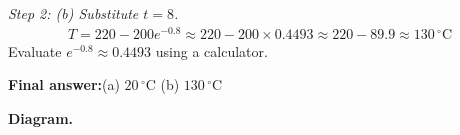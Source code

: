 \documentclass[11pt]{article}
\begin{document}
\textit{Step 2: (b) Substitute \( t = 8 \).}
\[\begin{gathered}
T = 220 - 200e^{-0.8} \approx 220 - 200 \times 0.4493 \approx 220 - 89.9 \approx 130\,^\circ\!\text{C}
\end{gathered}\]
Evaluate \( e^{-0.8} \approx 0.4493 \) using a calculator.

\begin{answerbox}
\textbf{Final answer:}\quad (a) \(\displaystyle  20\,^\circ\!\text{C} \) \quad  (b) \(\displaystyle  130\,^\circ\!\text{C} \)
\end{answerbox}
\textbf{Diagram.}

\begin{center}
\end{center}
\end{document}
